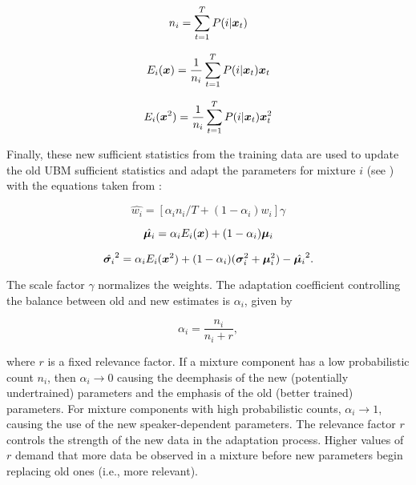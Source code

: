 \begin{equation}
    n_i = \sum_{t=1}^{T} \postprob{i}{\dvec{x}_t}
    \label{eq:n_i}
\end{equation}

\begin{equation}
    E_i(\dvec{x}) = \frac{1}{n_i} \sum_{t=1}^{T} \postprob{i}{\dvec{x}_t} \dvec{x}_t
    \label{eq:E_x}
\end{equation}

\begin{equation}
    E_i(\dvec{x}^2) = \frac{1}{n_i} \sum_{t=1}^{T} \postprob{i}{\dvec{x}_t} \dvec{x}_t^2
    \label{eq:E_x2}
\end{equation}

Finally, these new sufficient statistics from the training data are used to update the old UBM sufficient statistics and adapt the parameters for mixture $i$ (see ) with the equations taken from :

\begin{equation}
    \hat{w_i} = [\alpha_i n_i / T + (1 - \alpha_i)w_i]\gamma
    \label{eq:adapted_weight}
\end{equation}

\begin{equation}
    \hat{\dvec{\mu}_i} = \alpha_i E_i(\dvec{x}) + (1 - \alpha_i)\dvec{\mu}_i
    \label{eq:adapted_means}
\end{equation}

\begin{equation}
    \hat{\dvec{\sigma}_i}^2 = \alpha_i E_i(\dvec{x}^2) + (1 - \alpha_i)(\dvec{\sigma}_i^2 + \dvec{\mu}_i^2) - \hat{\dvec{\mu}_i}^2.
    \label{eq:adapted_variances}
\end{equation}

The scale factor $\gamma$ normalizes the weights. \noindent The adaptation coefficient controlling the balance between old and new estimates is $\alpha_i$, given by

\begin{equation}
    \alpha_i = \frac{n_i}{n_i + r},
    \label{eq:alpha_i}
\end{equation}

\noindent where $r$ is a fixed relevance factor. If a mixture component has a low probabilistic count $n_i$, then $\alpha_i \to 0$ causing the deemphasis of the new (potentially undertrained) parameters and the emphasis of the old (better trained) parameters. For mixture components with high probabilistic counts, $\alpha_i \to 1$, causing the use of the new speaker-dependent parameters. The relevance factor $r$ controls the strength of the new data in the adaptation process. Higher values of $r$ demand that more data be observed in a mixture before new parameters begin replacing old ones (i.e., more relevant).


